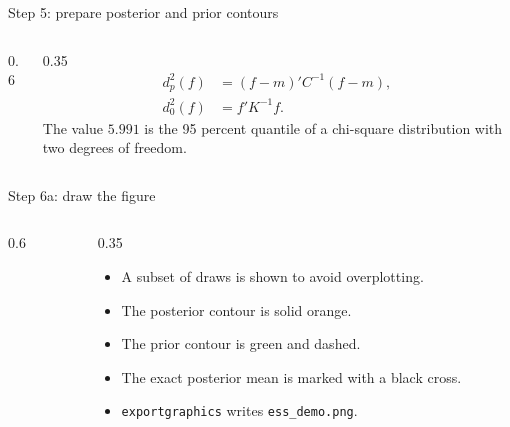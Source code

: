 \documentclass[aspectratio=169,11pt]{beamer}
\newcommand{\codefile}[1]{\texttt{#1}}
\begin{document}
\begin{frame}[fragile]{Step 5: prepare posterior and prior contours}
  \begin{columns}[T,totalwidth=\textwidth]
    \begin{column}{0.6\textwidth}
      
    \end{column}
    \begin{column}{0.35\textwidth}
      {\footnotesize
      \[
        \begin{aligned}
          d^2_p(f) &= (f-m)'C^{-1}(f-m),\\
          d^2_0(f) &= f'K^{-1}f.
        \end{aligned}
      \]
      }
      The value \(5.991\) is the 95 percent quantile of a chi-square distribution with two degrees of freedom.
    \end{column}
  \end{columns}
\end{frame}

\begin{frame}[fragile]{Step 6a: draw the figure}
  \begin{columns}[T,totalwidth=\textwidth]
    \begin{column}{0.6\textwidth}
      
    \end{column}
    \begin{column}{0.35\textwidth}
      \begin{itemize}
        \setlength{\itemsep}{0.7em}
        \item A subset of draws is shown to avoid overplotting.
        \item The posterior contour is solid orange.
        \item The prior contour is green and dashed.
        \item The exact posterior mean is marked with a black cross.
        \item \texttt{exportgraphics} writes \codefile{ess\_demo.png}.
      \end{itemize}
    \end{column}
  \end{columns}
\end{frame}
\end{document}
